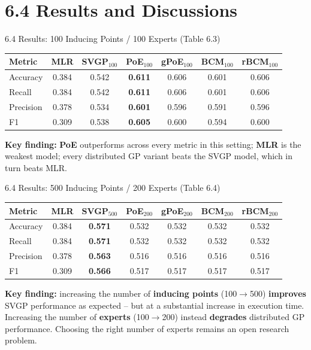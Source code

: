 \documentclass[aspectratio=169,10pt]{beamer}
\begin{document}
\section{6.4 Results and Discussions}

\begin{frame}{6.4 Results: 100 Inducing Points / 100 Experts (Table 6.3)}
  \begin{center}
  \renewcommand{\arraystretch}{1.15}
  \footnotesize
  \begin{tabular}{lcccccc}
    \toprule
    \textbf{Metric} & MLR & SVGP$_{100}$ & PoE$_{100}$ & gPoE$_{100}$ & BCM$_{100}$ & rBCM$_{100}$\\
    \midrule
    Accuracy  & 0.384 & 0.542 & \textbf{0.611} & 0.606 & 0.601 & 0.606\\
    Recall    & 0.384 & 0.542 & \textbf{0.611} & 0.606 & 0.601 & 0.606\\
    Precision & 0.378 & 0.534 & \textbf{0.601} & 0.596 & 0.591 & 0.596\\
    F1        & 0.309 & 0.538 & \textbf{0.605} & 0.600 & 0.594 & 0.600\\
    \bottomrule
  \end{tabular}
  \end{center}
  \vspace{0.4em}
  \textbf{Key finding:} \textbf{PoE} outperforms across every metric in this
  setting; \textbf{MLR} is the weakest model; every distributed GP variant
  beats the SVGP model, which in turn beats MLR.
\end{frame}

\begin{frame}{6.4 Results: 500 Inducing Points / 200 Experts (Table 6.4)}
  \begin{center}
  \renewcommand{\arraystretch}{1.15}
  \footnotesize
  \begin{tabular}{lcccccc}
    \toprule
    \textbf{Metric} & MLR & SVGP$_{500}$ & PoE$_{200}$ & gPoE$_{200}$ & BCM$_{200}$ & rBCM$_{200}$\\
    \midrule
    Accuracy  & 0.384 & \textbf{0.571} & 0.532 & 0.532 & 0.532 & 0.532\\
    Recall    & 0.384 & \textbf{0.571} & 0.532 & 0.532 & 0.532 & 0.532\\
    Precision & 0.378 & \textbf{0.563} & 0.516 & 0.516 & 0.516 & 0.516\\
    F1        & 0.309 & \textbf{0.566} & 0.517 & 0.517 & 0.517 & 0.517\\
    \bottomrule
  \end{tabular}
  \end{center}
  \vspace{0.4em}
  \textbf{Key finding:} increasing the number of \textbf{inducing points}
  (100$\to$500) \textbf{improves} SVGP performance as expected -- but at a
  substantial increase in execution time. Increasing the number of
  \textbf{experts} (100$\to$200) instead \textbf{degrades} distributed GP
  performance. Choosing the right number of experts remains an open research
  problem.
\end{frame}
\end{document}
